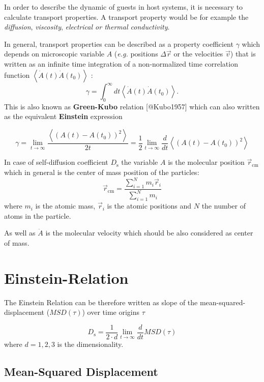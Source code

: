 \documentclass[
  letterpaper,
  DIV=11,
  numbers=noendperiod]{scrreprt}
\begin{document}

In order to describe the dynamic of guests in host systems, it is
necessary to calculate transport properties. A transport property would
be for example the \emph{diffusion}, \emph{viscosity}, \emph{electrical
or thermal conductivity}.

In general, transport properties can be described as a property
coefficient \(\gamma\) which depends on microscopic variable \(A\)
(\emph{e.g.} positions \(\Delta \vec{r}\) or the velocities \(\vec{v}\))
that is written as an infinite time integration of a non-normalized time
correlation function \(\left < \dot{A}(t)\dot{A}(t_0) \right >\) : \[
\gamma = \int_{0}^{\infty} dt \left < \dot{A}(t)\dot{A}(t_0) \right >.
\] This is also known as \textbf{Green-Kubo} relation {[}@Kubo1957{]}
which can also written as the equivalent \textbf{Einstein} expression

\[
\gamma = \lim_{t\to\infty} \frac{\left < (A(t) - A(t_0))^2 \right >}{2t} = \frac{1}{2} \lim_{t\to\infty} \frac{d}{dt} \left < (A(t) - A(t_0))^2 \right >
\]

In case of self-diffusion coefficient \(D_{\mathrm{s}}\) the variable
\(A\) is the molecular position \(\vec{r}_{\mathrm{cm}}\) which in
general is the center of mass position of the particles: \[
\vec{r}_{\mathrm{cm}} = \frac{\sum_{i=1}^{N} m_i \vec{r}_i}{\sum_{i=1}^{N} m_i}
\] where \(m_i\) is the atomic mass, \(\vec{r}_i\) is the atomic
positions and \(N\) the number of atoms in the particle.

As well as \(\dot{A}\) is the molecular velocity which should be also
considered as center of mass.

\hypertarget{einstein-relation-1}{%
\section*{Einstein-Relation}\label{einstein-relation-1}}


The Einstein Relation can be therefore written as slope of the
mean-squared-displacement (\(MSD(\tau)\)) over time origins \(\tau\)

\[
D_{\mathrm{s}} = \frac{1}{2 \cdot d} \lim _{t\to \infty} \frac{d}{dt} MSD(\tau)
\] where \(d=1,2,3\) is the dimensionality.

\hypertarget{mean-squared-displacement}{%
\subsection*{Mean-Squared
Displacement}\label{mean-squared-displacement}}
\end{document}
